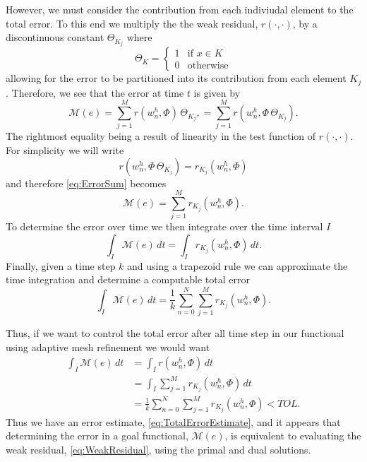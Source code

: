 However, we must consider the contribution from each indiviudal element to
the total error. To this end we multiply the the weak residual, $r(\cdot,
\cdot)$, by a discontinuous constant $\Theta_{K_j}$ where
\begin{equation}
    \Theta_K = \begin{cases}
        1 & \text{if } x \in K \\
        0 & \text{otherwise}
    \end{cases}
    \label{eq:DGTest}
\end{equation}
allowing for the error to be partitioned into its contribution from each element
$K_j$.
Therefore, we see that the error at time $t$ is given by
\begin{equation}
    \mathcal{M}(e) = \sum_{j=1}^M r(w^h_n, \Phi) \, \Theta_{K_j},
         = \sum_{j=1}^M r(w^h_n, \Phi\, \Theta_{K_j}).
    \label{eq:ErrorSum}
\end{equation}
The rightmost equality being a result of linearity in the test function of
$r(\cdot, \cdot)$.  For simplicity we will write
\begin{equation*}
    r(w^h_n, \Phi\, \Theta_{K_j}) = r_{K_j}(w^h_n, \Phi)
\end{equation*}
and therefore \eqref{eq:ErrorSum} becomes
\begin{equation}
    \mathcal{M}(e) = \sum_{j=1}^M r_{K_j}(w^h_n, \Phi).
    \label{eq:TotalError}
\end{equation}
To determine the error over time we then integrate over the time interval $I$
\begin{equation*}
    \int_I\! \mathcal{M}(e)\, dt = \int_I\! r_{K_j}(w^h_n, \Phi)\, dt.
\end{equation*}
Finally, given a time step $k$ and using a trapezoid rule we can approximate the
time integration and determine a computable total error
\begin{equation}
    \int_I\! \mathcal{M}(e)\, dt = \frac{1}{k} \sum_{n=0}^N \sum_{j=1}^M r_{K_j}(w^h_n, \Phi).
    \label{eq:TotalErrorEstimate}
\end{equation}

Thus, if we want to control the total error after all time step in our
functional using adaptive mesh refinement we would want
\begin{equation}
    \begin{split}
        \int_I\! \mathcal{M}(e)\, dt &= \int_I\! r(w^h_n, \Phi)\, dt \\
            &= \int_I\! \sum_{j=1}^M r_{K_j}(w^h_n, \Phi)\, dt \\
            &= \frac{1}{k} \sum_{n=0}^N \sum_{j=1}^M r_{K_j}(w^h_n, \Phi) < TOL.
    \end{split}
    \label{eq:Tol}
\end{equation}
Thus we have an error estimate, \eqref{eq:TotalErrorEstimate}, and it appears
that determining the error in a goal functional, $\mathcal{M}(e)$, is equivalent to
evaluating the weak residual, \eqref{eq:WeakResidual}, using the primal and dual
solutions.

